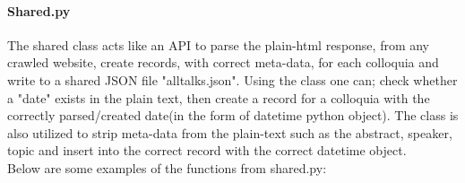 \documentclass[a4paper,11pt]{article}
\begin{document}
    \paragraph{Shared.py}
    The shared class acts like an API to parse the plain-html response, from any crawled website, create records, with correct meta-data, for each colloquia and write to a shared JSON file "alltalks.json". Using the class one can; check whether a "date" exists in the plain text, then create a record for a colloquia with the correctly parsed/created date(in the form of datetime python object). The class is also utilized to strip meta-data from the plain-text such as the abstract, speaker, topic and insert into the correct record with the correct datetime object. \\

    Below are some examples of the functions from shared.py:
\end{document}
